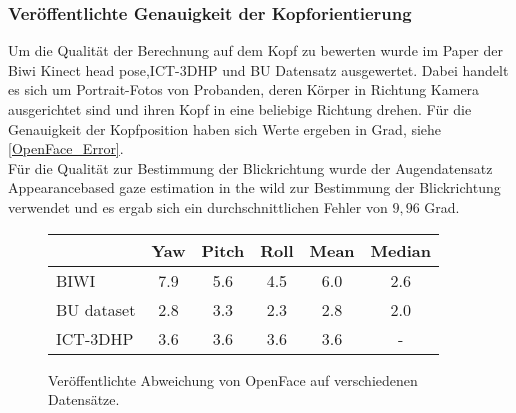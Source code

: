 \subsubsection{Veröffentlichte Genauigkeit der Kopforientierung}
Um die Qualität der Berechnung auf dem Kopf zu bewerten wurde im Paper \cite{OpenFace} der \glqq Biwi Kinect head pose\grqq \cite{BIWI_database},\glqq ICT-3DHP\grqq \cite{ICT_database} und \glqq BU Datensatz\grqq \cite{BU_database} ausgewertet. Dabei handelt es sich um Portrait-Fotos von Probanden, deren Körper in Richtung Kamera ausgerichtet sind und ihren Kopf in eine beliebige Richtung drehen. Für die Genauigkeit der Kopfposition haben sich Werte ergeben in Grad, siehe \autoref{OpenFace_Error}.\\
Für die Qualität zur Bestimmung der Blickrichtung wurde der Augendatensatz \glqq Appearancebased gaze estimation in the wild\grqq \cite{database_Eye_old} zur Bestimmung der Blickrichtung verwendet und es ergab sich ein durchschnittlichen Fehler von $9,96$ Grad.
\begin{figure}[h]
	\centering
	\begin{tabular}{|l|c|c|c||c|c|}
		\hline
		&Yaw&Pitch&Roll&Mean&Median\\\hline
		BIWI&7.9&5.6&4.5&6.0&2.6\\\hline
		BU dataset&2.8&3.3&2.3&2.8&2.0\\\hline
		ICT-3DHP&3.6&3.6&3.6&3.6&-\\\hline
	\end{tabular}
	\caption{Veröffentlichte Abweichung von OpenFace auf verschiedenen Datensätze.\cite{OpenFace}}
	\label{OpenFace_Error}
\end{figure}
